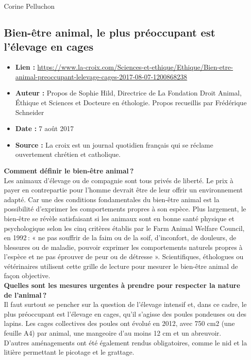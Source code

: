 \documentclass[10pt]{article}
\begin{document}
\begin{flushright}
	Corine Pelluchon
\end{flushright}

\newpage
\subsection{Bien-être animal, le plus préoccupant est l’élevage en cages}
\begin{itemize}
	\item \textbf{Lien : }  \url{https://www.la-croix.com/Sciences-et-ethique/Ethique/Bien-etre-animal-preoccupant-lelevage-cages-2017-08-07-1200868238} 
	\item \textbf{Auteur : } Propos de Sophie Hild, Directrice de La Fondation Droit Animal, Éthique et Sciences et Docteure en éthologie. Propos recueillis par Frédérique Schneider
	\item \textbf{Date : }  7 août 2017
	\item \textbf{Source : }  La croix est un journal quotidien français qui se réclame ouvertement chrétien et catholique.
\end{itemize}

\textbf{Comment définir le bien-être animal ?}\\

Les animaux d’élevage ou de compagnie sont tous privés de liberté. Le prix à payer en contrepartie pour l’homme devrait être de leur offrir un environnement adapté. Car une des conditions fondamentales du bien-être animal est la possibilité d’exprimer les comportements propres à son espèce. Plus largement, le bien-être se révèle satisfaisant si les animaux sont en bonne santé physique et psychologique selon les cinq critères établis par le Farm Animal Welfare Council, en 1992 : « ne pas souffrir de la faim ou de la soif, d’inconfort, de douleurs, de blessures ou de maladie, pouvoir exprimer les comportements naturels propres à l’espèce et ne pas éprouver de peur ou de détresse ». Scientifiques, éthologues ou vétérinaires utilisent cette grille de lecture pour mesurer le bien-être animal de façon objective.\\

\textbf{Quelles sont les mesures urgentes à prendre pour respecter la nature de l’animal ?}\\

Il faut surtout se pencher sur la question de l’élevage intensif et, dans ce cadre, le plus préoccupant est l’élevage en cages, qu’il s’agisse des poules pondeuses ou des lapins. Les cages collectives des poules ont évolué en 2012, avec 750 cm2 (une feuille A4) par animal, une mangeoire d’au moins 12 cm et un abreuvoir. D’autres aménagements ont été également rendus obligatoires, comme le nid et la litière permettant le picotage et le grattage.\\
\end{document}

